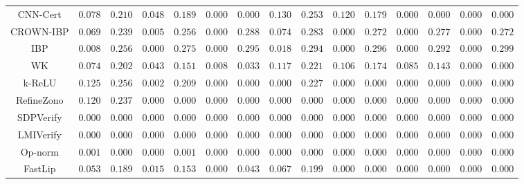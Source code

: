 \begin{table*}
{\begin{tabular}{c|c|c|c|c|c|c|c|c|c|c|c|c|c|c}
     CNN-Cert &       $0.078$ &       $0.210$ &       $0.048$ &       $0.189$ &       $0.000$ &       $0.000$ &       $0.130$ &       $0.253$ &       $0.120$ &       $0.179$ &       $0.000$ &       $0.000$ &       $0.000$ &       $0.000$ \\
    CROWN-IBP &       $0.069$ &       $0.239$ &       $0.005$ &       $0.256$ &       $0.000$ &       $0.288$ &       $0.074$ &       $0.283$ &       $0.000$ &       $0.272$ &       $0.000$ &       $0.277$ &       $0.000$ &       $0.272$ \\
          IBP &       $0.008$ &       $0.256$ &       $0.000$ &       $0.275$ &       $0.000$ &       $0.295$ &       $0.018$ &       $0.294$ &       $0.000$ &       $0.296$ &       $0.000$ &       $0.292$ &       $0.000$ &       $0.299$ \\
           WK &       $0.074$ &       $0.202$ &       $0.043$ &       $0.151$ &       $0.008$ &       $0.033$ &       $0.117$ &       $0.221$ &       $0.106$ &       $0.174$ &       $0.085$ &       $0.143$ &       $0.000$ &       $0.000$ \\
       k-ReLU &       $0.125$ &       $0.256$ &       $0.002$ &       $0.209$ &       $0.000$ &       $0.000$ &       $0.000$ &       $0.227$ &       $0.000$ &       $0.000$ &       $0.000$ &       $0.000$ &       $0.000$ &       $0.000$ \\
   RefineZono &       $0.120$ &       $0.237$ &       $0.000$ &       $0.000$ &       $0.000$ &       $0.000$ &       $0.000$ &       $0.000$ &       $0.000$ &       $0.000$ &       $0.000$ &       $0.000$ &       $0.000$ &       $0.000$ \\
    SDPVerify &       $0.000$ &       $0.000$ &       $0.000$ &       $0.000$ &       $0.000$ &       $0.000$ &       $0.000$ &       $0.000$ &       $0.000$ &       $0.000$ &       $0.000$ &       $0.000$ &       $0.000$ &       $0.000$ \\
    LMIVerify &       $0.000$ &       $0.000$ &       $0.000$ &       $0.000$ &       $0.000$ &       $0.000$ &       $0.000$ &       $0.000$ &       $0.000$ &       $0.000$ &       $0.000$ &       $0.000$ &       $0.000$ &       $0.000$ \\
      Op-norm &       $0.001$ &       $0.000$ &       $0.000$ &       $0.001$ &       $0.000$ &       $0.000$ &       $0.000$ &       $0.000$ &       $0.000$ &       $0.000$ &       $0.000$ &       $0.000$ &       $0.000$ &       $0.000$ \\
      FastLip &       $0.053$ &       $0.189$ &       $0.015$ &       $0.153$ &       $0.000$ &       $0.043$ &       $0.067$ &       $0.199$ &       $0.000$ &       $0.000$ &       $0.000$ &       $0.000$ &       $0.000$ &       $0.000$ \\

\end{tabular}}
\end{table*}
